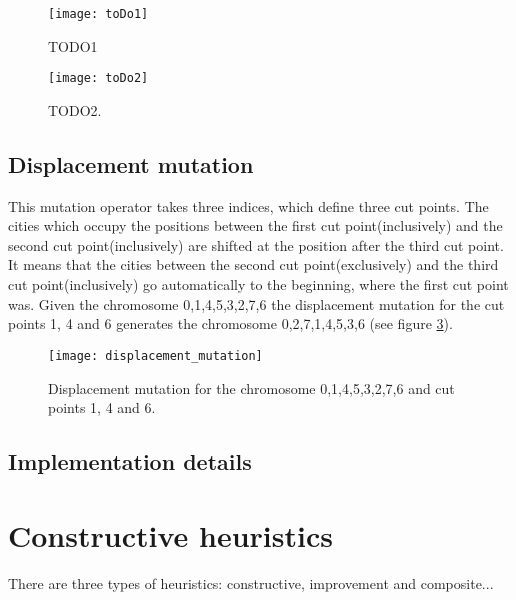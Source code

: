 \documentclass[a4paper, 12pt, headings=standardclasses]{scrartcl}
\begin{document}
\begin{figure}[!ht]
	\centering
	\texttt{[image: toDo1]}
	\caption{TODO1}
	\label{toDo1}
\end{figure}

\begin{figure}[!ht]
	\centering
	\texttt{[image: toDo2]}
	\caption{TODO2.}
	\label{toDo2}
\end{figure}

\subsection{Displacement mutation}

This mutation operator \cite{akay2013recent} takes three indices, which define three cut points. The cities which occupy the positions between the first cut point(inclusively) and the second cut point(inclusively) are shifted at the position after the third cut point.  It means that the cities between the second cut point(exclusively) and the third cut point(inclusively) go automatically to the beginning, where the first cut point was. Given the chromosome 0,1,4,5,3,2,7,6 the displacement mutation for the cut points 1, 4 and 6 generates the chromosome 0,2,7,1,4,5,3,6 (see figure \ref{displacement_mutation}).

\begin{figure}[!ht]
	\centering
	\texttt{[image: displacement\_mutation]}
	\caption{Displacement mutation for the chromosome 0,1,4,5,3,2,7,6 and cut points 1, 4 and 6.}
	\label{displacement_mutation}
\end{figure}

\subsection{Implementation details}

\section{Constructive heuristics}

There are three types of heuristics: constructive, improvement and composite...
\end{document}
